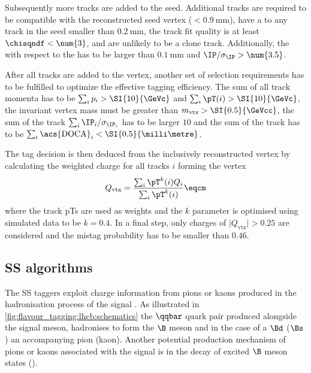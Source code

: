 Subsequently more tracks are added to the seed. Additional tracks are required
to be compatible with the reconstructed seed vertex
(\IP$<\SI{0.9}{\milli\metre}$), have a \DOCA to any track in the seed smaller
than $\SI{0.2}{\milli\metre}$, the track fit quality is at least
$\chisqndf<\num{3}$, and are unlikely to be a clone track. Additionally, the \IP
with respect to the \PV has to be larger than $\SI{0.1}{\milli\metre}$ and
$\text{\IP}/\sigma_\text{\IP}>\num{3.5}$.

After all tracks are added to the vertex, another set of selection requirements
has to be fulfilled to optimize the effective tagging efficiency. The sum of all
track momenta has to be $\sum_i p_i > \SI{10}{\GeVc}$ and $\sum_i \pT(i) >
\SI{10}{\GeVc}$, the invariant vertex mass must be greater than $m_\text{vtx} >
\SI{0.5}{\GeVcc}$, the sum of the track
$\sum_i\text{\IP}_i/\sigma_{\text{\IP}_i}$ has to be larger $\num{10}$ and the
sum of the track \DOCA has to be $\sum_i\text{\acs{DOCA}}_i <
\SI{0.5}{\milli\metre}$.

The tag decision is then deduced from the inclusively reconstructed vertex by
calculating the weighted charge for all tracks $i$ forming the vertex
%
\begin{equation}\label{eq:flavour_tagging:os:vertex:charge}
  Q_\text{vtx} = \frac{\sum_i \pT^k(i)Q_i}{\sum_i\pT^k(i)}\eqcm
\end{equation}
%
where the track \acp{pT} are used as weights and the $k$ parameter is optimised
using simulated data to be $k=\num{0.4}$. In a final step, only charges of
$\vert Q_\text{vtx} \vert > 0.25$ are considered and the mistag probability has
to be smaller than $\num{0.46}$.

\subsection{\Acl*{SS} algorithms}
\label{sec:flavour_tagging:ss}

The \acl{SS} taggers exploit charge information from pions or kaons produced in
the hadronisation process of the signal \Bmeson. As illustrated in
\cref{fig:flavour_tagging:lhcb:schematics} the $\qqbar$ quark pair produced
alongside the signal meson, hadronises to form the $\B$ meson and in the case of
a $\Bd$ ($\Bs$) an accompanying pion (kaon). Another potential production
mechanism of pions or kaons associated with the signal \Bmeson is in the decay
of excited $\B$ meson states (\cf \cite{FT:KaonNNet}).

